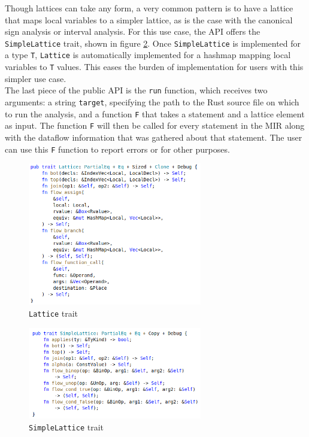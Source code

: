 \documentclass[11pt,a4paper]{article}
\begin{document}
Though lattices can take any form, a very common pattern is to have a lattice
that maps local variables to a simpler lattice, as is the case with the canonical
sign analysis or interval analysis. For this use case, the API offers the
\texttt{SimpleLattice} trait, shown in figure \ref{fig:simple_lattice}.
Once \texttt{SimpleLattice} is implemented for a type \texttt{T}, \texttt{Lattice}
is automatically implemented for a hashmap mapping local variables to \texttt{T}
values. This eases the burden of implementation for users with this simpler
use case.\\

The last piece of the public API is the \texttt{run} function, which receives two arguments:
a string \texttt{target}, specifying the path to the Rust source file on which to run the
analysis, and a function \texttt{F} that takes a statement and a lattice element as input.
The function \texttt{F} will then be called for every statement in the MIR along with the
dataflow information that was gathered about that statement. The user can use this \texttt{F} function
to report errors or for other purposes.


\begin{figure}
    \includegraphics[width=7.6cm]{img/lattice.png}
    \caption{\texttt{Lattice} trait}
    \label{fig:lattice}
\end{figure}

\begin{figure}
    \includegraphics[width=7.6cm]{img/simplelattice.png}
    \caption{\texttt{SimpleLattice} trait}
    \label{fig:simple_lattice}
\end{figure}
\end{document}

